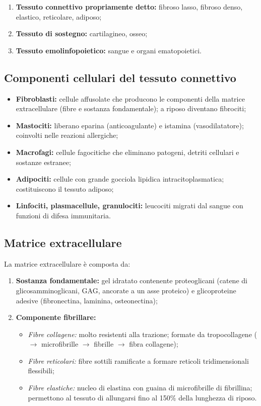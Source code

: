 \documentclass[11pt,a4paper,openright,twoside]{book}
\theoremstyle{definition}
\theoremstyle{plain}
\theoremstyle{remark}
\begin{document}
\begin{enumerate}
  \item \textbf{Tessuto connettivo propriamente detto:} fibroso lasso, fibroso denso, elastico, reticolare, adiposo;
  \item \textbf{Tessuto di sostegno:} cartilagineo, osseo;
  \item \textbf{Tessuto emolinfopoietico:} sangue e organi ematopoietici.
\end{enumerate}

\subsection{Componenti cellulari del tessuto connettivo}

\begin{itemize}
  \item \textbf{Fibroblasti:} cellule affusolate che producono le componenti della matrice extracellulare (fibre e sostanza fondamentale); a riposo diventano fibrociti;
  \item \textbf{Mastociti:} liberano eparina (anticoagulante) e istamina (vasodilatatore); coinvolti nelle reazioni allergiche;
  \item \textbf{Macrofagi:} cellule fagocitiche che eliminano patogeni, detriti cellulari e sostanze estranee;
  \item \textbf{Adipociti:} cellule con grande gocciola lipidica intracitoplasmatica; costituiscono il tessuto adiposo;
  \item \textbf{Linfociti, plasmacellule, granulociti:} leucociti migrati dal sangue con funzioni di difesa immunitaria.
\end{itemize}

\subsection{Matrice extracellulare}

La matrice extracellulare è composta da:
\begin{enumerate}
  \item \textbf{Sostanza fondamentale:} gel idratato contenente proteoglicani (catene di glicosamminoglicani, GAG, ancorate a un asse proteico) e glicoproteine adesive (fibronectina, laminina, osteonectina);
  \item \textbf{Componente fibrillare:}
    \begin{itemize}
      \item \textit{Fibre collagene:} molto resistenti alla trazione; formate da tropocollagene ($\to$ microfibrille $\to$ fibrille $\to$ fibra collagene);
      \item \textit{Fibre reticolari:} fibre sottili ramificate a formare reticoli tridimensionali flessibili;
      \item \textit{Fibre elastiche:} nucleo di elastina con guaina di microfibrille di fibrillina; permettono al tessuto di allungarsi fino al 150\% della lunghezza di riposo.
    \end{itemize}
\end{enumerate}
\end{document}
